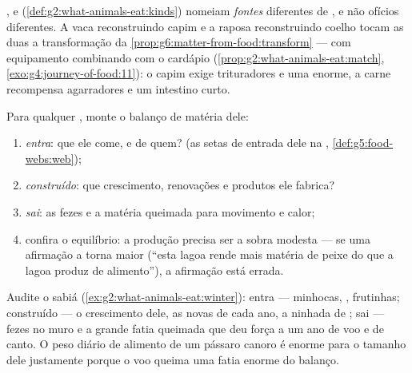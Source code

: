 \begin{proposition}\label{prop:g6:matter-from-food:menus}
,  e 
(\cref{def:g2:what-animals-eat:kinds}) nomeiam \emph{fontes}
diferentes de , e não ofícios diferentes. A vaca
reconstruindo capim e a raposa reconstruindo coelho tocam as duas a
transformação da \cref{prop:g6:matter-from-food:transform} --- com
equipamento combinando com o cardápio
(\cref{prop:g2:what-animals-eat:match},
\cref{exo:g4:journey-of-food:11}): o capim exige trituradores e uma
 enorme, a carne recompensa agarradores e um intestino curto.
\end{proposition}
\admitted

\begin{method}\label{met:g6:matter-from-food:audit}
Para qualquer , monte o balanço de matéria dele:
\begin{enumerate}
  \item \emph{entra}: que  ele come, e de quem? (as
        setas de entrada dele na ,
        \cref{def:g5:food-webs:web});
  \item \emph{construído}: que crescimento, renovações e produtos ele
        fabrica?
  \item \emph{sai}: as fezes e a matéria queimada para movimento e
        calor;
  \item confira o equilíbrio: a produção precisa ser a sobra modesta
        --- se uma afirmação a torna maior (``esta lagoa rende mais
        matéria de peixe do que a lagoa produz de alimento''), a
        afirmação está errada.
\end{enumerate}
\end{method}

\begin{example}\label{ex:g6:matter-from-food:audituse}
Audite o sabiá (\cref{ex:g2:what-animals-eat:winter}): entra ---
minhocas, , frutinhas; construído --- o crescimento dele, as
 novas de cada ano, a ninhada de ; sai --- fezes no muro e a
grande fatia queimada que deu força a um ano de voo e de canto. O
peso diário de alimento de um pássaro canoro é enorme para o tamanho
dele justamente porque o voo queima uma fatia enorme do balanço.
\end{example}

